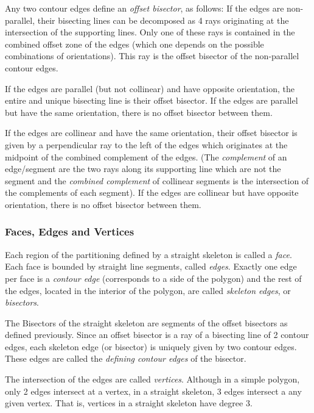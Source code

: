 Any two contour edges define an {\em offset bisector}, as follows: If
the edges are non-parallel, their bisecting lines can be decomposed as
4 rays originating at the intersection of the supporting lines. Only
one of these rays is contained in the combined offset zone of the
edges (which one depends on the possible combinations of
orientations). This ray is the offset bisector of the non-parallel
contour edges.

If the edges are parallel (but not collinear) and have opposite
orientation, the entire and unique bisecting line is their offset
bisector. If the edges are parallel but have the same orientation,
there is no offset bisector between them.

If the edges are collinear and have the same orientation, their offset
bisector is given by a perpendicular ray to the left of the edges
which originates at the midpoint of the combined complement of
the edges. (The {\em complement} of an edge/segment are the two
rays along its supporting line which are not the segment and the
{\em combined complement} of  collinear segments is the
intersection of the complements of each segment). If the edges are
collinear but have opposite orientation, there is no offset bisector
between them.


\subsubsection{Faces, Edges and Vertices}

Each region of the partitioning defined by a straight skeleton is
called a {\em face}. Each face is bounded by straight line segments,
called {\em edges}. Exactly one edge per face is a {\em contour edge}
(corresponds to a side of the polygon) and the rest of the edges,
located in the interior of the polygon, are called {\em skeleton
edges}, or {\em bisectors}.

The Bisectors of the straight skeleton are segments of the offset
bisectors as defined previously. Since an offset bisector is a ray of
a bisecting line of 2 contour edges, each skeleton edge (or bisector)
is uniquely given by two contour edges. These edges are called the
{\em defining contour edges} of the bisector.

The intersection of the edges are called {\em vertices}. Although in a
simple polygon, only 2 edges intersect at a vertex, in a straight
skeleton, 3 edges intersect a any given vertex. That is, vertices in a
straight skeleton have degree 3.

